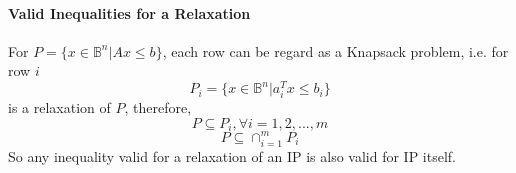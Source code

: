             \paragraph{Valid Inequalities for a Relaxation}
                For $P=\{x\in \mathbb{B}^n | Ax\le b\}$, each row can be regard as a Knapsack problem, i.e. for row $i$
                \begin{equation*}
                    P_i = \{x\in \mathbb{B}^n | a_i^T x \le b_i\} 
                \end{equation*}
                is a relaxation of $P$, therefore,
                \begin{equation*}
                    P\subseteq P_i, \forall i=1,2,...,m 
                \end{equation*}
                \begin{equation*}
                    P\subseteq \cap_{i=1}^m P_i 
                \end{equation*}
                So any inequality valid for a relaxation of an IP is also valid for IP itself.
                
